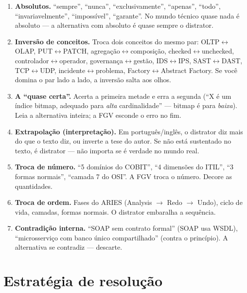 \begin{pegadinha}
\begin{enumerate}
\item \textbf{Absolutos.} ``sempre'', ``nunca'', ``exclusivamente'',
``apenas'', ``todo'', ``invariavelmente'', ``impossível'', ``garante''. No
mundo técnico quase nada é absoluto --- a alternativa com absoluto é quase
sempre o distrator.
\item \textbf{Inversão de conceitos.} Troca dois conceitos do mesmo par:
OLTP$\leftrightarrow$OLAP, PUT$\leftrightarrow$PATCH,
agregação$\leftrightarrow$composição, checked$\leftrightarrow$unchecked,
controlador$\leftrightarrow$operador, governança$\leftrightarrow$gestão,
IDS$\leftrightarrow$IPS, SAST$\leftrightarrow$DAST, TCP$\leftrightarrow$UDP,
incidente$\leftrightarrow$problema, Factory$\leftrightarrow$Abstract Factory.
Se você domina o par lado a lado, a inversão salta aos olhos.
\item \textbf{A ``quase certa''.} Acerta a primeira metade e erra a segunda
(``X é um índice bitmap, adequado para \emph{alta} cardinalidade'' --- bitmap
é para \emph{baixa}). Leia a alternativa inteira; a FGV esconde o erro no
fim.
\item \textbf{Extrapolação (interpretação).} Em português/inglês, o distrator
diz mais do que o texto diz, ou inverte a tese do autor. Se não está
sustentado no texto, é distrator --- não importa se é verdade no mundo real.
\item \textbf{Troca de número.} ``5 domínios do COBIT'', ``4 dimensões do
ITIL'', ``3 formas normais'', ``camada 7 do OSI''. A FGV troca o número.
Decore as quantidades.
\item \textbf{Troca de ordem.} Fases do ARIES (Analysis $\to$ Redo $\to$
Undo), ciclo de vida, camadas, formas normais. O distrator embaralha a
sequência.
\item \textbf{Contradição interna.} ``SOAP sem contrato formal'' (SOAP usa
WSDL), ``microsserviço com banco único compartilhado'' (contra o princípio).
A alternativa se contradiz --- descarte.
\end{enumerate}
\end{pegadinha}

\section{Estratégia de resolução}

